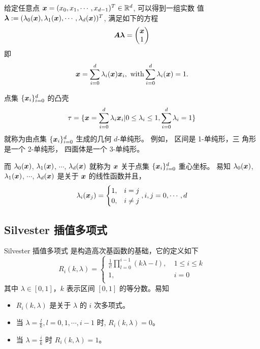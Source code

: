 \documentclass{article}
\begin{document}
 
给定任意点 ${\boldsymbol x}=(x_0, x_1, \cdots, x_{d-1})^T\in \mathbb R^d$, 可以得到一组实数
值 ${\bm \lambda} := (\lambda_0({\boldsymbol x}), \lambda_1({\boldsymbol x}), \cdots, \lambda_d({\boldsymbol x}))^T$, 满足如下的方程
\begin{equation}
    {\boldsymbol A} {\bm \lambda}=
    \begin{pmatrix}
        {\boldsymbol x} \\ 1
    \end{pmatrix}
    \label{eq:lbc}
\end{equation}
即
\begin{equation}
    {\boldsymbol x} = \sum\limits_{i=0}^{d}\lambda_i({\boldsymbol x}) {\boldsymbol x}_i,
    \text{ with} \sum\limits_{i=0}^{d}\lambda_i({\boldsymbol x}) = 1.
\end{equation}

点集 $\{{\boldsymbol x}_i\}_{i=0}^d$ 的凸壳
\begin{equation}
    \tau = \{{\boldsymbol x} = \sum_{i=0}^{d}\lambda_i{\boldsymbol x}_i | 0\leq \lambda_i \leq
    1, \sum_{i=0}^d\lambda_i = 1\}
\end{equation}
就称为由点集 $\{{\boldsymbol x}_i\}_{i=0}^d$ 生成的几何 $d$-单纯形。 例如， 区间是 1-单纯形，三
角形是一个 2-单纯形， 四面体是一个 3-单纯形。

而 $\lambda_0({\boldsymbol x})$, $\lambda_1({\boldsymbol x})$, $\cdots$, $\lambda_{d}({\boldsymbol x})$ 就称为
${\boldsymbol x}$
关于点集 $\{{\boldsymbol x}_i\}_{i=0}^d$ 重心坐标。  易知 $\lambda_0({\boldsymbol x})$,
$\lambda_1({\boldsymbol x})$, $\cdots$, $\lambda_{d}({\boldsymbol x})$ 是关于 ${\boldsymbol x}$ 的线性函数并且，
\begin{equation}
    \lambda_i({\boldsymbol x}_j) = 
    \begin{cases}
        1, & i = j\\
        0, & i\not= j
    \end{cases}, 
    i, j = 0, \cdots, d
\end{equation}

\subsection{Silvester 插值多项式}

Silvester 插值多项式\cite{sheng2008} 是构造高次基函数的基础，它的定义如下
$$
R_i(k,\lambda)=
\begin{cases}
\frac{1}{i!}\prod_{l=0}^{i-1} (k\lambda-l),~& 1\leq i\leq k\\
1,& i=0\\
\end{cases}
$$
其中 $\lambda \in [0,1]$，$k$ 表示区间 $[0,1]$ 的等分数。易知 

\begin{itemize}
    \item $R_i(k, \lambda)$ 是关于 $\lambda$ 的 $i$ 次多项式。
    \item 当 $\lambda= \frac{l}{k}, l=0, 1, \cdots, i-1$ 时, $R_i(k, \lambda) =0$。
    \item 当 $\lambda=\frac{i}{k}$ 时 $R_i(k, \lambda) = 1$。
\end{itemize}
\end{document}
